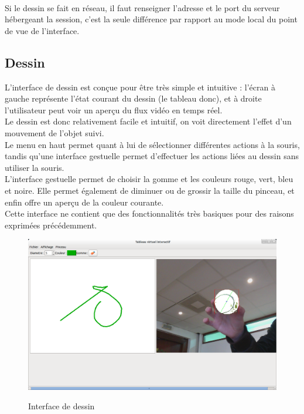 \documentclass{report}
\begin{document}
				\paragraph{}
				Si le dessin se fait en réseau, il faut renseigner l'adresse et le port du serveur hébergeant la session, c'est la seule différence par rapport au mode local du point de vue de l'interface.
				\newpage
			\subsection{Dessin}
			L'interface de dessin est conçue pour être très simple et intuitive : l'écran à gauche représente l'état courant du dessin (le tableau donc), et à droite l'utilisateur peut voir un aperçu du flux vidéo en temps réel. \\
			Le dessin est donc relativement facile et intuitif, on voit directement l'effet d'un mouvement de l'objet suivi. \\
			Le menu en haut permet quant à lui de sélectionner différentes actions à la souris, tandis qu'une interface gestuelle permet d'effectuer les actions liées au dessin sans utiliser la souris. \\
			L'interface gestuelle permet de choisir la gomme et les couleurs rouge, vert, bleu et noire. Elle permet également de diminuer ou de grossir la taille du pinceau, et enfin offre un aperçu de la couleur courante. \\
			Cette interface ne contient que des fonctionnalités très basiques pour des raisons exprimées précédemment. \\
				\begin{figure}[!h]
						\centering
						\includegraphics[scale=0.4]{capture.png}\\
						\caption{Interface de dessin}
						\label{Interface de dessin}
				\end{figure}
\end{document}
